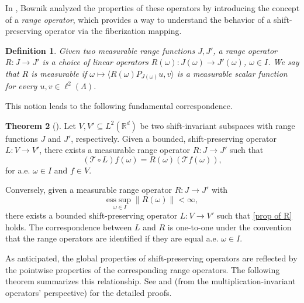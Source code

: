 \documentclass[a4paper,11pt]{amsart}
\newtheorem{fed}{Definition}[section]
\theoremstyle{definition}
\newtheorem{teo}[fed]{Theorem}
\theoremstyle{definition}
\def\La{\Lambda}
\def\w{\omega}
\def\R{\mathbb{R}}
\newcommand{\esssup}{{\mathrm{ess}\sup}}
\begin{document}
	In \cite{B}, Bownik analyzed the properties of these operators by  introducing the concept of a  \textit{range operator}, which provides a way to understand the behavior of a shift-preserving operator via the fiberization mapping.
	
	\begin{fed}\label{range operator}
		Given two measurable range functions $J,J'$, a range operator $R: J\to J'$ is a choice of linear operators $R(\w):J(\w) \to J'(\w)$, $\w\in  I$.
		We say that $R$ is {\it measurable} if  $\omega \mapsto \langle R(\omega) P_{J(\omega)} u,v\rangle$ is a measurable scalar function for every $u,v\in\ell^2(\La)$.
	\end{fed}
	
	This notion leads to the following fundamental correspondence.
	
	\begin{teo}[{\cite[Theorem 4.5]{B}}] Let $V, V' \subseteq L^2(\R^d)$ be two shift-invariant subspaces with range functions $J$ and $J'$, respectively.
		Given a bounded, shift-preserving operator $L:V\rightarrow V'$, there exists a measurable range operator $R: J \to J'$ such that 
		\begin{equation}\label{prop of R}
			(\mathcal T\circ L) f(\omega) = R(\omega) \left(\mathcal T f(\omega)\right),
		\end{equation}
		for a.e. $\omega\in I$ and $f\in V$.
		
		Conversely, given a measurable range operator $R: J \to J'$ with $$\underset{\omega\in  I}{\esssup} \|R(\omega)\|<\infty,$$ there exists a bounded shift-preserving operator $L: V\to V'$ such that  \eqref{prop of R} holds. The correspondence between $L$ and $R$ is one-to-one under the convention that the range operators are identified if they are equal a.e. $\w\in I$. 
	\end{teo}
	
	As anticipated, the global properties of shift-preserving operators are reflected by the pointwise properties of the corresponding range operators. The following theorem summarizes this relationship. See \cite{B} and \cite{BI2019} (from the multiplication-invariant operators' perspective) for the detailed proofs. 
	
\end{document}
